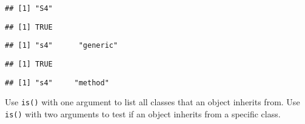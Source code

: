 \begin{verbatim}
## [1] "S4"
\end{verbatim}

\begin{Shaded}
\begin{Highlighting}[]
\end{Highlighting}
\end{Shaded}

\begin{verbatim}
## [1] TRUE
\end{verbatim}

\begin{Shaded}
\begin{Highlighting}[]
\end{Highlighting}
\end{Shaded}

\begin{verbatim}
## [1] "s4"      "generic"
\end{verbatim}

\begin{Shaded}
\begin{Highlighting}[]
\StringTok{ }\NormalTok{(}
\end{Highlighting}
\end{Shaded}

\begin{verbatim}
## [1] TRUE
\end{verbatim}

\begin{Shaded}
\begin{Highlighting}[]
\end{Highlighting}
\end{Shaded}

\begin{verbatim}
## [1] "s4"     "method"
\end{verbatim}

Use \texttt{is()} with one argument to list all classes that an object
inherits from. Use \texttt{is()} with two arguments to test if an object
inherits from a specific class.

\begin{Shaded}
\begin{Highlighting}[]
\end{Highlighting}
\end{Shaded}

